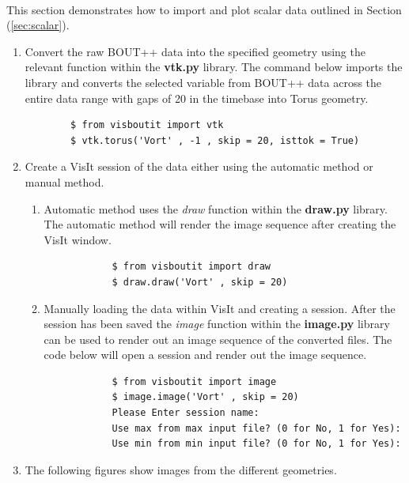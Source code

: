 \documentclass[12pt,a4paper]{article}
\begin{document}
\paragraph{} This section demonstrates how to import and plot scalar data outlined in Section (\ref{sec:scalar}).
\begin{enumerate}
	\item{Convert the raw BOUT++ data into the specified geometry using the relevant function within the \textbf{vtk.py} library. The command below imports the library and converts the selected variable from BOUT++ data across the entire data range with gaps of 20 in the timebase into Torus geometry.
		\begin{verbatim}
		$ from visboutit import vtk
		$ vtk.torus('Vort' , -1 , skip = 20, isttok = True)
		\end{verbatim}}
	\item{Create a VisIt session of the data either using the automatic method or manual method.}
	\begin{enumerate}
		\item{Automatic method uses the \textit{draw} function within the \textbf{draw.py} library. The automatic method will render the image sequence after creating the VisIt window.
			\begin{verbatim}
			$ from visboutit import draw
			$ draw.draw('Vort' , skip = 20)
			\end{verbatim}
		}
		\item{Manually loading the data within VisIt and creating a session. After the session has been saved the \textit{image} function within the \textbf{image.py} library can be used to render out an image sequence of the converted files. The code below will open a session and render out the image sequence.
			\begin{verbatim}
			$ from visboutit import image
			$ image.image('Vort' , skip = 20)
			Please Enter session name:
			Use max from max input file? (0 for No, 1 for Yes):
			Use min from min input file? (0 for No, 1 for Yes):
			\end{verbatim}
		}
	\end{enumerate}
	\item{The following figures show images from the different geometries.}
\end{enumerate}
\end{document}
